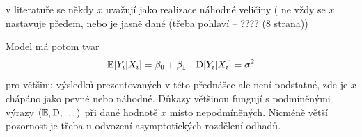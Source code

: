 \begin{center}    
\end{center}

\begin{remark}
v literatuře se někdy $ x $ uvažují jako realizace náhodné veličiny ( ne vždy se $ x $ nastavuje předem, nebo je jasně dané (třeba pohlaví -- ???? (8 strana)) 
\end{remark}
Model má potom tvar
$$
 \mathbb{E} [ Y_{i} \vert X_{i} ] = \beta_{0} + \beta_{1} \quad  \mathrm{D} [ Y_{i} \vert X_{i} ] = \sigma^{2}
$$
pro většinu výsledků prezentovaných v této přednášce ale není podstatné, zde je $ x $ chápáno jako pevné nebo náhodné.
Důkazy většinou fungují s podmíněnými výrazy $ ( \mathbb{E} , \mathrm{D} , \dots )  $ při dané hodnotě $ x $ místo nepodmíněných.
Nicméně větší pozornost je třeba u odvození asymptotických rozdělení odhadů.

